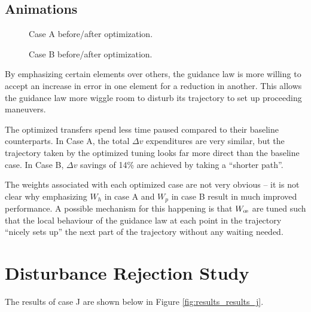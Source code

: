 \subsection{Animations}
\begin{figure}[H]
    \begin{animateinline}[controls,width=\linewidth, loop]{10}
    \end{animateinline}
    \caption{Case A before/after optimization.}
    \label{fig:benchmark_optim_anim}
\end{figure}
\begin{figure}[H]
    \begin{animateinline}[controls,width=\linewidth, loop]{10}
    \end{animateinline}
    \caption{Case B before/after optimization.}
    \label{fig:g_optim_anim}
\end{figure}

By emphasizing certain elements over others, the guidance law is more willing to accept an increase in error in one element for a reduction in another. This allows the guidance law more wiggle room to disturb its trajectory to set up proceeding maneuvers.

The optimized transfers spend less time paused compared to their baseline counterparts. In Case A, the total \(\Delta v\) expenditures are very similar, but the trajectory taken by the optimized tuning looks far more direct than the baseline case. In Case B, \(\Delta v\) savings of 14\% are achieved by taking a ``shorter path''.

The weights associated with each optimized case are not very obvious -- it is not clear why emphasizing \(W_h\) in case A and \(W_p\) in case B result in much improved performance. A possible mechanism for this happening is that \(W_\moe\) are tuned such that the local behaviour of the guidance law at each point in the trajectory ``nicely sets up'' the next part of the trajectory without any waiting needed.
\section{Disturbance Rejection Study}
The results of case J are shown below in Figure \ref{fig:results_results_j}.

